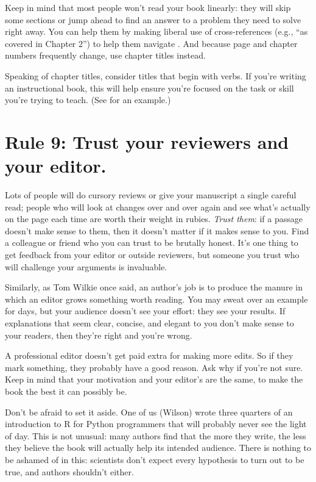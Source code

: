\documentclass[10pt,letterpaper]{article}
\begin{document}
Keep in mind that most people won't read your book linearly: they will
skip some sections or jump ahead to find an answer to a problem they
need to solve right away. You can help them by making liberal use of
cross-references (e.g., ``as covered in Chapter 2'') to help them
navigate \cite{Li2020}. And because page and chapter numbers frequently
change, use chapter titles instead.

Speaking of chapter titles, consider titles that begin with verbs. If
you're writing an instructional book, this will help ensure you're
focused on the task or skill you're trying to teach. (See \cite{Me2022}
for an example.)

\section*{Rule 9: Trust your reviewers and your editor.}

Lots of people will do cursory reviews or give your manuscript a single
careful read; people who will look at changes over and over again and
see what's actually on the page each time are worth their weight in
rubies. \emph{Trust them}: if a passage doesn't make sense to them, then
it doesn't matter if it makes sense to you. Find a colleague or friend
who you can trust to be brutally honest. It's one thing to get feedback
from your editor or outside reviewers, but someone you trust who will
challenge your arguments is invaluable.

Similarly, as Tom Wilkie once said, an author's job is to produce the
manure in which an editor grows something worth reading. You may sweat
over an example for days, but your audience doesn't see your effort:
they see your results. If explanations that seem clear, concise, and
elegant to you don't make sense to your readers, then they're right and
you're wrong.

A professional editor doesn't get paid extra for making more edits. So
if they mark something, they probably have a good reason. Ask why if
you're not sure. Keep in mind that your motivation and your editor's are
the same, to make the book the best it can possibly be.

Don't be afraid to set it aside. One of us (Wilson) wrote three quarters
of an introduction to R for Python programmers that will probably never
see the light of day. This is not unusual: many authors find that the
more they write, the less they believe the book will actually help its
intended audience. There is nothing to be ashamed of in this: scientists
don't expect every hypothesis to turn out to be true, and authors
shouldn't either.
\end{document}
